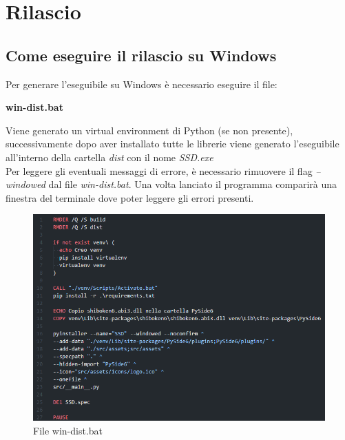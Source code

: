 \section{Rilascio}

\subsection{Come eseguire il rilascio su Windows}
Per generare l'eseguibile su Windows è necessario eseguire il file:
\newline{}\centerline{\textbf{win-dist.bat}}\newline{}
Viene generato un virtual environment di Python (se non presente), successivamente dopo aver installato tutte le librerie viene generato l'eseguibile all'interno della cartella \textit{dist} con il nome \textit{SSD.exe}\\
Per leggere gli eventuali messaggi di errore, è necessario rimuovere il flag \textit{--windowed} dal file \textit{win-dist.bat}. Una volta lanciato il programma comparirà una finestra del terminale dove poter leggere gli errori presenti.
\begin{figure}[H]
    \centering
    \includegraphics[scale = 0.6]{components/img/pyinstaller.png}
    \caption{File win-dist.bat}
    \label{fig:File win-dist.bat}
\end{figure}
